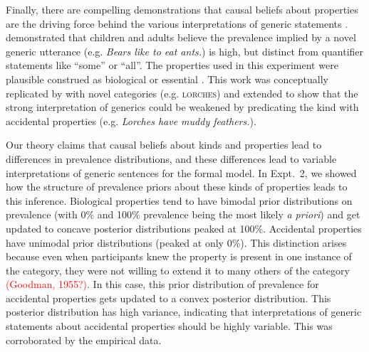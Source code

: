 \documentclass[12pt,letterpaper]{article}
\newcommand{\red}[1]{\textcolor{Red}{#1}}
\begin{document}




Finally, there are compelling demonstrations that causal beliefs about properties are the driving force behind the various interpretations of generic statements \cite{Gelman2007, Cimpian2010c}.
 demonstrated that children and adults believe the prevalence implied by a novel generic utterance (e.g. \emph{Bears like to eat ants.}) is high, but distinct from quantifier statements like ``some'' or ``all''. 
The properties used in this experiment were plausible construed as biological or essential \cite{Gelman2003}.
This work was conceptually replicated by  with novel categories (e.g. \textsc{lorches}) and extended to show that the strong interpretation of generics could be weakened by predicating the kind with accidental properties (e.g. \emph{Lorches have muddy feathers.}).


%
%


Our theory claims that causal beliefs about kinds and properties lead to differences in prevalence distributions, and these differences lead to variable interpretations of generic sentences for the formal model. 
In Expt.~2, we showed how the structure of prevalence priors about these kinds of properties leads to this inference. 
Biological properties tend to have bimodal prior distributions on prevalence (with 0\% and 100\% prevalence being the most likely \emph{a priori}) and get updated to concave posterior distributions peaked at 100\%.
Accidental properties have unimodal prior distributions (peaked at only 0\%). 
This distinction arises because even when participants knew the property is present in one instance of the category, they were not willing to extend it to many others of the category \red{(Goodman, 1955?)}. 
In this case, this prior distribution of prevalence for accidental properties gets updated to a convex posterior distribution.
This posterior distribution has high variance, indicating that interpretations of generic statements about accidental properties should be highly variable.
This was corroborated by the empirical data. 
\end{document}
